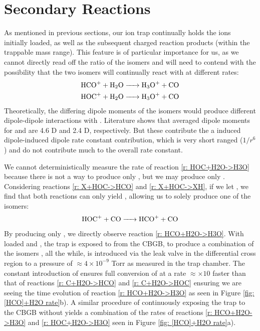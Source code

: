 \section{Secondary Reactions}

As mentioned in previous sections, our ion trap continually holds the ions initially loaded, as well as the subsequent charged reaction products (within the trappable mass range). This feature is of particular importance for us, as we cannot directly read off the ratio of the isomers and will need to contend with the possibility that the two isomers will continually react with  at different rates:
\begin{align}
	\ce{HCO+ + H2O & -> H3O+ + CO} \label{r: HCO+H2O->H3O} \\
	\ce{HOC+ + H2O & -> H3O+ + CO} \label{r: HOC+H2O->H3O}
\end{align}
Theoretically, the differing dipole moments of the isomers would produce different dipole-dipole interactions with . Literature shows that averaged dipole moments for  and  are 4.6 D and 2.4 D, respectively.\cite{Rogers1982} But these contribute the a induced dipole-induced dipole rate constant contribution, which is very short ranged ($1/r^6$) and do not contribute much to the overall rate constant.

We cannot deterministically measure the rate of reaction \ref{r: HOC+H2O->H3O} because there is not a way to produce only , but we may produce only . Considering reactions \ref{r: X+HOC->HCO} and \ref{r: X+HOC->XH}, if we let , we find that both reactions can only yield , allowing us to solely produce one of the isomers:
\begin{equation}
	\ce{HOC+ + CO -> HCO+ + CO} \label{r: HOC+CO->HCO}
\end{equation}
By producing only , we directly observe reaction \ref{r: HCO+H2O->H3O}. With loaded  and , the trap is exposed to  from the CBGB, to produce a combination of the isomers \ce{[HCO]+}, all the while,  is introduced via the leak valve in the differential cross region to a pressure of $\approx 4 \times 10^{-9}$ Torr as measured in the trap chamber. The constant introduction of  ensures full conversion of  at a rate $\approx \times 10$ faster than that of reactions \ref{r: C+H2O->HCO} and \ref{r: C+H2O->HOC} ensuring we are seeing the time evolution of reaction \ref{r: HCO+H2O->H3O} as seen in Figure \ref{fig: [HCO]+H2O rate}b). A similar procedure of continuously exposing the trap to the CBGB without  yields a combination of the rates of reactions \ref{r: HCO+H2O->H3O} and \ref{r: HOC+H2O->H3O} seen in Figure \ref{fig: [HCO]+H2O rate}a).

